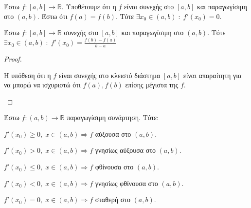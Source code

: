 \begin{thm}[Rolle]
  Έστω $ f \colon [a,b] \to \mathbb{R} $. Υποθέτουμε ότι η $ f $ είναι συνεχής 
  στο $ [a,b] $ και παραγωγίσιμη στο $ (a,b) $. Έστω ότι $ f(a)=f(b) $. Τότε
  $ \exists x_{0} \in (a,b) \; : \; f'(x_{0}) = 0 $.
\end{thm}


\begin{thm}
  Έστω $ f \colon [a,b] \to \mathbb{R} $ συνεχής στο $ [a,b] $ και παραγωγίσιμη 
  στο $ (a,b) $. Τότε $ \exists x_{0} \in (a,b) \; : \; f'(x_{0}) = 
  \frac{f(b)-f(a)}{b-a} $
\end{thm}

\begin{proof}
  \begin{rem}
    Η υπόθεση ότι η $f$ είναι συνεχής στο κλειστό διάστημα $ [a,b] $ είναι 
    απαραίτητη για να μπορώ να ισχυριστώ ότι $ f(a), f(b) $ επίσης 
    μέγιστα της $f$.
  \end{rem}   
\end{proof}

\begin{thm}
  Έστω $ f \colon (a,b) \to \mathbb{R} $ παραγωγίσιμη συνάρτηση. Τότε:
  \begin{myitemize}
    \item $ f'(x_{0}) \geq 0, \; x \in (a,b) \Rightarrow f $ αύξουσα στο $ (a,b) $.
    \item $ f'(x_{0}) > 0, \; x \in (a,b) \Rightarrow f $ γνησίως αύξουσα στο 
      $ (a,b) $.
    \item $ f'(x_{0}) \leq 0, \; x \in (a,b) \Rightarrow f $ φθίνουσα στο $ (a,b) $.
    \item $ f'(x_{0}) < 0, \; x \in (a,b) \Rightarrow f$ γνησίως φθίνουσα στο 
      $ (a,b) $.
    \item $ f'(x_{0}) = 0, \; x \in (a,b) \Rightarrow f $ σταθερή στο $ (a,b) $.
  \end{myitemize}
\end{thm}




